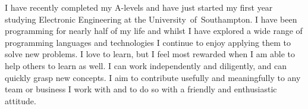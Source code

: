 
I have recently completed my A-levels and have just started my first year studying Electronic Engineering at the \mbox{University of Southampton}. I have been programming for nearly half of my life and whilst I have explored a wide range of programming languages and technologies I continue to enjoy applying them to solve new problems. I love to learn, but I feel most rewarded when I am able to help others to learn as well. I can work independently and diligently, and can quickly grasp new concepts. I aim to contribute usefully and meaningfully to any team or business I work with and to do so with a friendly and enthusiastic attitude.
